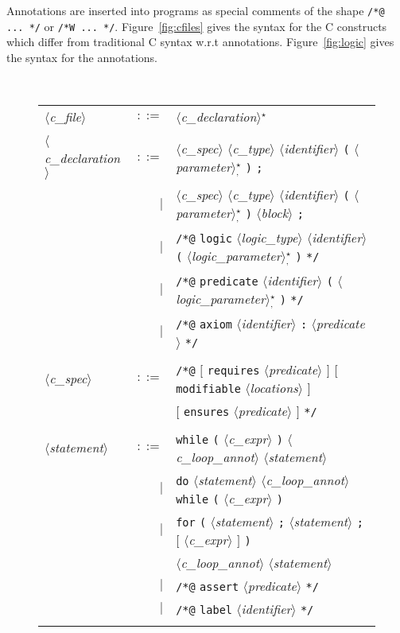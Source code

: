 \documentclass[a4paper,12pt]{report}
\makeatletter
\newcommand{\te}[1]{\texttt{#1}}
\newcommand{\nt}[1]{$\langle$\textsl{#1}$\rangle$}
\newcommand{\indextt}[1]{\index{#1@\texttt{#1}}}
\newcommand{\etoile}{$^{\star}$}
\newcommand{\etoilesep}[1]{$^{\star}_#1$}
\makeatother
\begin{document}
Annotations are inserted into programs as special comments of the shape
\texttt{/*@ ... */} or \texttt{/*W ... */}.
Figure~\ref{fig:cfiles} gives the syntax for the C constructs which
differ from traditional C syntax w.r.t annotations.
Figure~\ref{fig:logic} gives the syntax for the
annotations. 

\begin{figure}[htbp]
\begin{center}
\hrulefill\\
\begin{tabular}{lrl}
  \nt{c\_file}
    & $::=$ & \nt{c\_declaration}\etoile\ \\
  \\[0.1em]

  \nt{c\_declaration}
    & $::=$ & \nt{c\_spec} \nt{c\_type} \nt{identifier} \te{(} 
              \nt{parameter}\etoilesep{\te{,}} \te{)} 
              \te{;} \\
      & $|$ & \nt{c\_spec} \nt{c\_type} \nt{identifier} \te{(} 
              \nt{parameter}\etoilesep{\te{,}} \te{)} 
              \nt{block} \te{;} \\
      & $|$ & \te{/*@} \te{logic} \nt{logic\_type} \nt{identifier} \te{(} 
              \nt{logic\_parameter}\etoilesep{\te{,}} \te{)} \te{*/} \\
      & $|$ & \te{/*@} \te{predicate} \nt{identifier} \te{(} 
              \nt{logic\_parameter}\etoilesep{\te{,}} \te{)} \te{*/} \\
      & $|$ & \te{/*@} \te{axiom} \nt{identifier} \te{:} 
              \nt{predicate} \te{*/} \\
  \\[0.1em]

  \nt{c\_spec}
    & $::=$ & \te{/*@} $[$ \te{requires} \nt{predicate} $]$ 
              $[$ \te{modifiable} \nt{locations} $]$\\
           && $[$ \te{ensures} \nt{predicate} $]$ \te{*/}  \\
  \\[0.1em]

  \nt{statement}
    & $::=$ & \te{while} \te{(} \nt{c\_expr} \te{)}
              \nt{c\_loop\_annot} \nt{statement} \\
    &   $|$ & \te{do} \nt{statement} \nt{c\_loop\_annot} 
              \te{while} \te{(} \nt{c\_expr} \te{)} \\
    &   $|$ & \te{for} \te{(} \nt{statement} \te{;} \nt{statement} \te{;}
              $[$ \nt{c\_expr} $]$ \te{)} \\
           && \nt{c\_loop\_annot} \nt{statement} \\
    &   $|$ & \te{/*@} \te{assert} \nt{predicate} \te{*/} \\ \indextt{assert}
    &   $|$ & \te{/*@} \te{label} \nt{identifier} \te{*/} \\ \indextt{label}
  \\[0.1em]


\end{tabular}
\end{center}
\end{figure}
\end{document}
